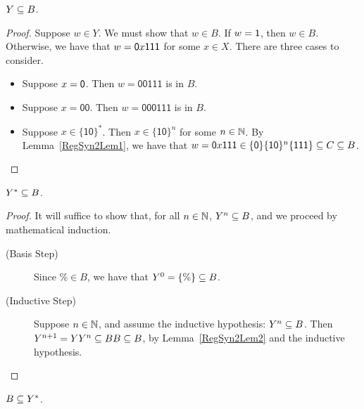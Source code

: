 \begin{lemma}
\label{RegSyn2Lem2}
$Y\subseteq B$.
\end{lemma}

\begin{proof}
Suppose $w\in Y$.  We must show that $w\in B$.  If $w=\mathsf{1}$, then
$w\in B$.  Otherwise, we have that $w=\mathsf{0} x\mathsf{111}$ for some
$x\in X$.  There are three cases to consider.
\begin{itemize}
\item Suppose $x=\mathsf{0}$.  Then $w=\mathsf{00111}$ is in $B$.

\item Suppose $x=\mathsf{00}$.  Then $w=\mathsf{000111}$ is in $B$.

\item Suppose $x\in\{\mathsf{10}\}^*$.  Then $x\in \{\mathsf{10}\}^n$
for some $n\in\mathbb{N}$.  By Lemma~\ref{RegSyn2Lem1},
we have that $w=\mathsf{0} x\mathsf{111}\in
\{\mathsf{0}\}\{\mathsf{10}\}^n\{\mathsf{111}\}\subseteq C\subseteq B$.
\end{itemize}
\end{proof}

\begin{lemma}
\label{RegSyn2Lem3}
$Y^*\subseteq B$.
\end{lemma}

\begin{proof}
It will suffice to show that, for all $n\in\mathbb{N}$, $Y^n\subseteq B$, and
we proceed by mathematical induction.
\begin{description}
\item[\quad(Basis Step)] Since $\%\in B$, we have that $Y^0=\{\%\}\subseteq B$.

\item[\quad(Inductive Step)] Suppose $n\in\mathbb{N}$, and assume the
  inductive hypothesis: $Y^n\subseteq B$.  Then $Y^{n+1} = YY^n \subseteq BB
  \subseteq B$, by Lemma~\ref{RegSyn2Lem2} and the inductive hypothesis.
\end{description}
\end{proof}

\begin{lemma}
\label{RegSyn2Lem5}
$B\subseteq Y^*$.
\end{lemma}

